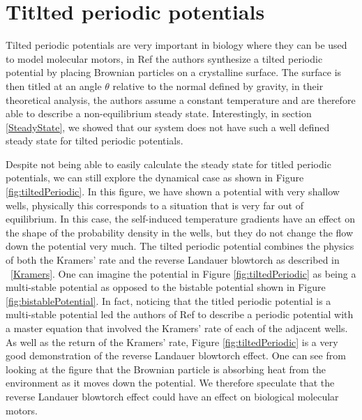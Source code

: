 
\section{Titlted periodic potentials}
Tilted periodic potentials are very important in biology where they can be used to model molecular motors, in Ref \cite{MaLaiAckersonEtAl2015, MaLaiAckersonEtAl2015a} the authors synthesize a tilted periodic potential by placing Brownian particles on a crystalline surface. The surface is then titled at an angle $\theta$ relative to the normal defined by gravity, in their theoretical analysis, the authors assume a constant temperature and are therefore able to describe a non-equilibrium steady state. Interestingly, in section \ref{SteadyState}, we showed that our system does not have such a well defined steady state for tilted periodic potentials.

Despite not being able to easily calculate the steady state for titled periodic potentials, we can still explore the dynamical case as shown in Figure \ref{fig:tiltedPeriodic}. In this figure, we have shown a potential with very shallow wells, physically this corresponds to a situation that is very far out of equilibrium. In this case, the self-induced temperature gradients have an effect on the shape of the probability density in the wells, but they do not change the flow down the potential very much. The tilted periodic potential combines the physics of both the Kramers' rate and the reverse Landauer blowtorch as described in ~\autoref{Kramers}. One can imagine the potential in Figure \ref{fig:tiltedPeriodic} as being a multi-stable potential as opposed to the bistable potential shown in Figure \ref{fig:bistablePotential}. In fact, noticing that the titled periodic potential is a multi-stable potential led the authors of Ref \cite{ChallisJack2014} to describe a periodic potential with a master equation that involved the Kramers' rate of each of the adjacent wells. As well as the return of the Kramers' rate, Figure \ref{fig:tiltedPeriodic} is a very good demonstration of the reverse Landauer blowtorch effect. One can see from looking at the figure that the Brownian particle is absorbing heat from the environment as it moves down the potential. We therefore speculate that the reverse Landauer blowtorch effect could have an effect on biological molecular motors.

